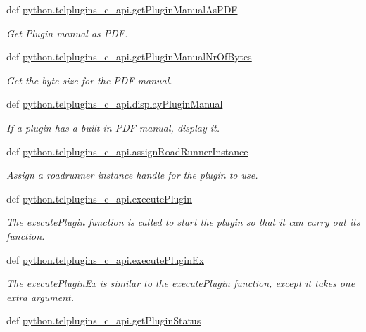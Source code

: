\begin{DoxyCompactItemize}
def \hyperlink{group__plugins_ga6c06cbacb7c5aa475d111cf4cba8d8c4}{python.\-telplugins\-\_\-c\-\_\-api.\-get\-Plugin\-Manual\-As\-P\-D\-F}
\begin{DoxyCompactList}\small\item\em Get Plugin manual as P\-D\-F. \end{DoxyCompactList}\item 
def \hyperlink{group__plugins_ga9b3d3389c445c3ddf0968e8f8dcb5bc8}{python.\-telplugins\-\_\-c\-\_\-api.\-get\-Plugin\-Manual\-Nr\-Of\-Bytes}
\begin{DoxyCompactList}\small\item\em Get the byte size for the P\-D\-F manual. \end{DoxyCompactList}\item 
def \hyperlink{group__plugins_ga7665c9b302ac38f299bb28ab038c66e6}{python.\-telplugins\-\_\-c\-\_\-api.\-display\-Plugin\-Manual}
\begin{DoxyCompactList}\small\item\em If a plugin has a built-\/in P\-D\-F manual, display it. \end{DoxyCompactList}\item 
def \hyperlink{group__plugins_ga8865aaf00281ac78a5c6fd36160a5c4c}{python.\-telplugins\-\_\-c\-\_\-api.\-assign\-Road\-Runner\-Instance}
\begin{DoxyCompactList}\small\item\em Assign a roadrunner instance handle for the plugin to use. \end{DoxyCompactList}\item 
def \hyperlink{group__plugins_ga71ef8ba0927f7816f8cd679b8057920b}{python.\-telplugins\-\_\-c\-\_\-api.\-execute\-Plugin}
\begin{DoxyCompactList}\small\item\em The execute\-Plugin function is called to start the plugin so that it can carry out its function. \end{DoxyCompactList}\item 
def \hyperlink{group__plugins_gad6d3512c7d27f6dab98f60febe9a5146}{python.\-telplugins\-\_\-c\-\_\-api.\-execute\-Plugin\-Ex}
\begin{DoxyCompactList}\small\item\em The execute\-Plugin\-Ex is similar to the execute\-Plugin function, except it takes one extra argument. \end{DoxyCompactList}\item 
def \hyperlink{group__plugins_gab9bf021fedc121b4367c5d6698f6309a}{python.\-telplugins\-\_\-c\-\_\-api.\-get\-Plugin\-Status}

\end{DoxyCompactItemize}
